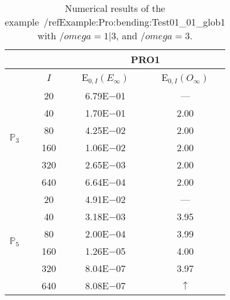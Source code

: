 \begin{table}[H]
\caption{Numerical results of the example~/ref{Example:Pro:bending:Test01_01_glob1} with $/omega=1|3$, and $/omega=3$.}
\setlength{\tabcolsep}{5pt}
\centering
\begin{tabular}{@{}l c c c@{}}
\toprule
 &  & \multicolumn{2}{c}{PRO1}\\
\midrule
 & $I$ & E$_{0,I}(E_{\infty})$ & E$_{0,I}(O_{\infty})$\\
\midrule
\multirow{6}{*}{$\mathbb{P}_{3}$}
 & 20 & 6.79E$-$01 & ---\\
 & 40 & 1.70E$-$01 & 2.00\\
 & 80 & 4.25E$-$02 & 2.00\\
 & 160 & 1.06E$-$02 & 2.00\\
 & 320 & 2.65E$-$03 & 2.00\\
 & 640 & 6.64E$-$04 & 2.00\\
\midrule
\multirow{6}{*}{$\mathbb{P}_{5}$}
 & 20 & 4.91E$-$02 & ---\\
 & 40 & 3.18E$-$03 & 3.95\\
 & 80 & 2.00E$-$04 & 3.99\\
 & 160 & 1.26E$-$05 & 4.00\\
 & 320 & 8.04E$-$07 & 3.97\\
 & 640 & 8.08E$-$07 & $\uparrow$\\
\bottomrule
\end{tabular}
\label{Table:PRO:test_01_01_test29_pro1}
\end{table}
